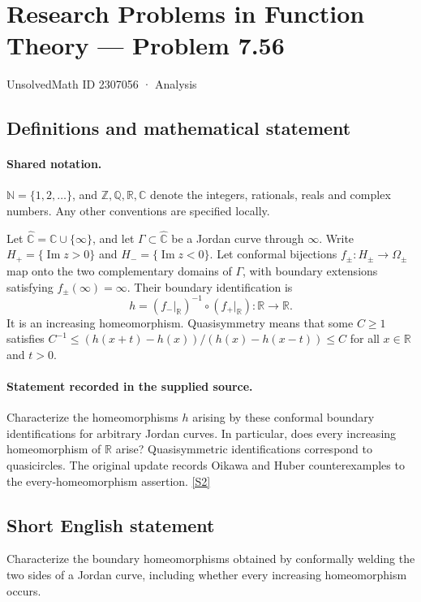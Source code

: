\documentclass[11pt]{article}
\newcommand{\sref}[2]{\hyperlink{source:#1:#2}{[S#2]}}
\begin{document}
\setcounter{section}{2307055}
\section{Research Problems in Function Theory — Problem 7.56}\label{2307056}
{\small\sffamily UnsolvedMath ID 2307056 · Analysis}
\subsection{Definitions and mathematical statement}

\paragraph{Shared notation.}$\mathbb N=\{1,2,\ldots\}$, and $\mathbb Z,\mathbb Q,\mathbb R,\mathbb C$ denote the integers, rationals, reals and complex numbers. Any other conventions are specified locally.


Let $\widehat{\mathbb C}=\mathbb C\cup\{\infty\}$, and let $\Gamma\subset\widehat{\mathbb C}$ be a Jordan curve through $\infty$. Write $H_+=\{\operatorname{Im}z>0\}$ and $H_-=\{\operatorname{Im}z<0\}$. Let conformal bijections $f_\pm:H_\pm\to\Omega_\pm$ map onto the two complementary domains of $\Gamma$, with boundary extensions satisfying $f_\pm(\infty)=\infty$. Their boundary identification is
\[h=(f_-|_{\mathbb R})^{-1}\circ(f_+|_{\mathbb R}):\mathbb R\to\mathbb R.
\]
It is an increasing homeomorphism. Quasisymmetry means that some $C\ge1$ satisfies $C^{-1}\le(h(x+t)-h(x))/(h(x)-h(x-t))\le C$ for all $x\in\mathbb R$ and $t>0$.
\paragraph{Statement recorded in the supplied source.}
Characterize the homeomorphisms $h$ arising by these conformal boundary identifications for arbitrary Jordan curves. In particular, does every increasing homeomorphism of $\mathbb R$ arise? Quasisymmetric identifications correspond to quasicircles. The original update records Oikawa and Huber counterexamples to the every-homeomorphism assertion. \sref{2307056}{2}
\subsection{Short English statement}
Characterize the boundary homeomorphisms obtained by conformally welding the two sides of a Jordan curve, including whether every increasing homeomorphism occurs.
\end{document}
